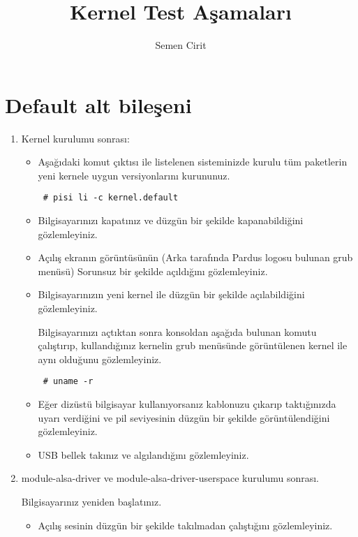 \documentclass[a4paper,10pt]{article}
\title{Kernel Test Aşamaları}
\author{Semen Cirit}
\begin{document}
\maketitle

\section{Default alt bileşeni}
\begin{enumerate}

 \item Kernel kurulumu sonrası:

\begin{itemize}
\item
Aşağıdaki komut çıktısı ile listelenen sisteminizde kurulu tüm paketlerin yeni kernele uygun versiyonlarını kurununuz.
\begin{verbatim}
 # pisi li -c kernel.default
\end{verbatim}

\item Bilgisayarınızı kapatınız ve düzgün bir şekilde kapanabildiğini gözlemleyiniz.
\item Açılış ekranın görüntüsünün (Arka tarafında Pardus logosu bulunan grub menüsü) Sorunsuz bir şekilde açıldığını gözlemleyiniz.
\item Bilgisayarınızın yeni kernel ile düzgün bir şekilde açılabildiğini gözlemleyiniz.

Bilgisayarınızı açtıktan sonra konsoldan aşağıda bulunan komutu çalıştırıp, kullandığınız kernelin grub menüsünde görüntülenen kernel ile aynı olduğunu gözlemleyiniz.
\begin{verbatim}
 # uname -r 
\end{verbatim}

\item Eğer dizüstü bilgisayar kullanıyorsanız kablonuzu çıkarıp taktığınızda uyarı verdiğini ve pil seviyesinin düzgün bir şekilde görüntülendiğini gözlemleyiniz.
\item USB bellek takınız ve algılandığını gözlemleyiniz.
\end{itemize}

\item module-alsa-driver ve module-alsa-driver-userspace kurulumu sonrası.

Bilgisayarınız yeniden başlatınız.
\begin{itemize}
\item Açılış sesinin düzgün bir şekilde takılmadan çalıştığını gözlemleyiniz.


\end{itemize}
\end{enumerate}
\end{document}
